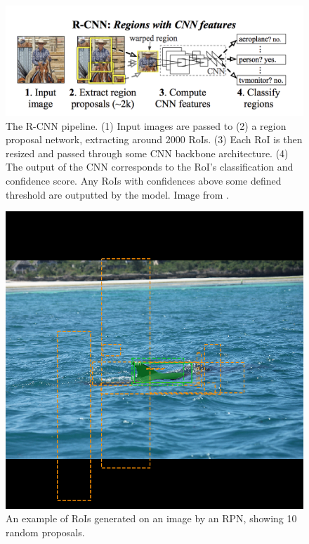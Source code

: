 \begin{figure}
	\begin{center}
		\includegraphics[scale=0.45]{Chapter2/figs/r-cnn.png}
	\end{center}
	\caption[The R-CNN pipeline.]{The R-CNN pipeline. (1) Input images are passed to (2) a region proposal network, extracting around 2000 RoIs. (3) Each RoI is then resized and passed through some CNN backbone architecture. (4) The output of the CNN corresponds to the RoI's classification and confidence score. Any RoIs with confidences above some defined threshold are outputted by the model. Image from \cite{girshick_rich_2014}.}
	\label{fig:r-cnn}
\end{figure}

\begin{figure}
	\begin{center}
		\includegraphics[scale=0.3]{Chapter2/figs/rpn-ten-random-orange.png}
	\end{center}
	\caption{An example of RoIs generated on an image by an RPN, showing 10 random proposals.}
	\label{fig:rpn-randoms}
\end{figure}

